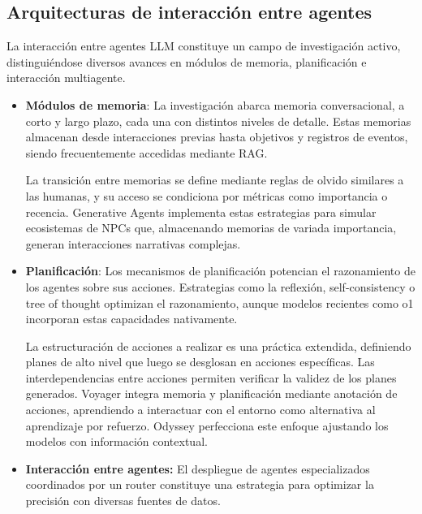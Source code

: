 \subsection{Arquitecturas de interacción entre agentes}
La interacción entre agentes LLM constituye un campo de investigación activo, distinguiéndose diversos avances en módulos de memoria, planificación e interacción multiagente\cite{wang_survey_2024}.
\begin{itemize}
\item{\textbf{Módulos de memoria}}: La investigación abarca memoria conversacional, a corto y largo plazo, cada una con distintos niveles de detalle\cite{zhang_building_2024}. Estas memorias almacenan desde interacciones previas hasta objetivos y registros de eventos\cite{fischer_reflective_2023}\cite{liang_unleashing_2023}, siendo frecuentemente accedidas mediante RAG\cite{zhao_expel_2024}.

La transición entre memorias se define mediante reglas de olvido similares a las humanas\cite{zhong_memorybank_2024}, y su acceso se condiciona por métricas como importancia o recencia\cite{wang_survey_2024}. Generative Agents\cite{park_generative_2023} implementa estas estrategias para simular ecosistemas de NPCs que, almacenando memorias de variada importancia, generan interacciones narrativas complejas.
\item{\textbf{Planificación}}: Los mecanismos de planificación potencian el razonamiento de los agentes sobre sus acciones. Estrategias como la reflexión\cite{shinn_reflexion_nodate}\cite{shinn_reflexion_nodate}\cite{madaan_self-refine_nodate}\cite{miao_selfcheck_2023}, self-consistency\cite{liang_unleashing_2023} o tree of thought\cite{yao_tree_nodate}\cite{wang_recmind_2024} optimizan el razonamiento, aunque modelos recientes como o1 incorporan estas capacidades nativamente.

La estructuración de acciones a realizar es una práctica extendida, definiendo planes de alto nivel que luego se desglosan en acciones específicas\cite{lin_swiftsage_nodate}\cite{huang_language_nodate}\cite{wang_describe_2024}\cite{zhu_ghost_2023}\cite{song_llm-planner_2023}. Las interdependencias entre acciones permiten verificar la validez de los planes generados\cite{raman_planning_nodate}\cite{liu_llmp_2023}\cite{dagan_dynamic_2023}.
Voyager integra memoria y planificación mediante anotación de acciones\cite{wang_voyager_2023}, aprendiendo a interactuar con el entorno como alternativa al aprendizaje por refuerzo. Odyssey perfecciona este enfoque ajustando los modelos con información contextual\cite{liu_odyssey_2024}.
\item{\textbf{Interacción entre agentes: }}El despliegue de agentes especializados coordinados por un router constituye una estrategia para optimizar la precisión con diversas fuentes de datos\cite{karpas_mrkl_2022}\cite{ge_openagi_nodate}.


\end{itemize}
